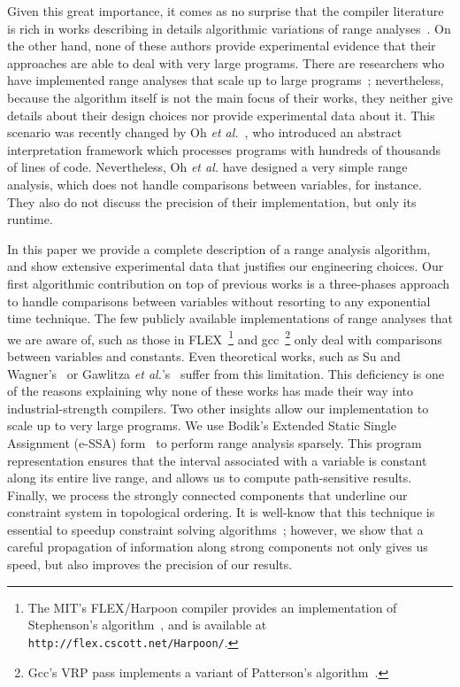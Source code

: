 \documentclass{llncs}
\begin{document}
Given this great importance, it comes as no surprise that the compiler
literature is rich in works describing in details algorithmic variations of
range analyses~\cite{Gawlitza09,Mahlke01,Stephenson00,Su05}.
On the other hand, none of these authors provide experimental evidence that
their approaches are able to deal with very large programs.
There are researchers who have implemented range analyses that scale up to
large programs~\cite{Blanchet03,Venet04}; nevertheless, because the
algorithm itself is not the main focus of their works, they neither give
details about their design choices nor provide experimental data about it.
This scenario was recently changed by Oh {\em et al.}~\cite{Oh12}, who
introduced an abstract interpretation framework which processes programs with
hundreds of thousands of lines of code.
Nevertheless, Oh {\em et al.} have designed a very simple range analysis,
which does not handle comparisons between variables, for instance.
They also do not discuss the precision of their implementation, but only its
runtime.

In this paper we provide a complete description of a range analysis algorithm,
and show extensive experimental data that justifies our engineering choices.
Our first algorithmic contribution on top of previous works is a three-phases
approach to handle comparisons between variables without resorting to any
exponential time technique.
The few publicly available implementations of range analyses that we are
aware of, such as those in FLEX~\footnote{The MIT's FLEX/Harpoon compiler
provides an implementation of Stephenson's algorithm~\cite{Stephenson00}, and
is available at \texttt{http://flex.cscott.net/Harpoon/}.} and
gcc~\footnote{Gcc's VRP pass implements a variant of Patterson's
algorithm~\cite{Patterson95}.} only deal with comparisons between variables and
constants.
Even theoretical works, such as Su and Wagner's~\cite{Su05} or Gawlitza
{\em et al.}'s~\cite{Gawlitza09} suffer from this limitation.
This deficiency is one of the reasons explaining why none of these works has
made their way into industrial-strength compilers.
Two other insights allow our implementation to scale up to very large
programs.
We use Bodik's Extended Static Single Assignment (e-SSA) form~\cite{Bodik00} to
perform range analysis sparsely.
This program representation ensures that the interval associated with
a variable is constant along its entire live range, and allows us to compute
path-sensitive results.
Finally, we process the strongly connected components that underline our
constraint system in topological ordering.
It is well-know that this technique is essential to speedup constraint solving
algorithms~\cite[Sec 6.3]{Nielson99}; however, we show that a careful
propagation of information along strong components not only gives us speed, but
also improves the precision of our results.
\end{document}
